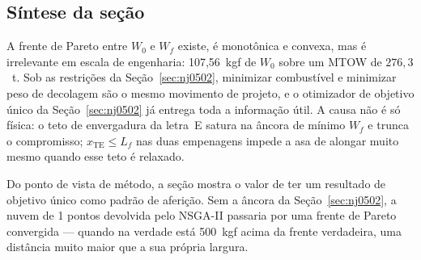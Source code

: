 \subsection{Síntese da seção}
\label{sec:p4sintese}

A frente de Pareto entre $W_0$ e $W_f$ existe, é monotônica e convexa,
mas é irrelevante em escala de engenharia: 107{,}56~kgf de $W_0$
sobre um MTOW de $276{,}3$~t. Sob as restrições da
Seção~\ref{sec:nj0502}, minimizar combustível e minimizar peso de
decolagem são o mesmo movimento de projeto, e o otimizador de objetivo
único da Seção~\ref{sec:nj0502} já entrega toda a informação útil. A
causa não é só física: o teto de envergadura da letra~E satura na
âncora de mínimo $W_f$ e trunca o compromisso; $x_{\mathrm{TE}}\le L_f$
nas duas empenagens impede a asa de alongar muito mesmo quando esse teto
é relaxado.

Do ponto de vista de método, a seção mostra o valor de ter um resultado
de objetivo único como padrão de aferição. Sem a âncora da
Seção~\ref{sec:nj0502}, a nuvem de 1 pontos devolvida pelo
NSGA-II passaria por uma frente de Pareto convergida --- quando na
verdade está 500~kgf acima da frente verdadeira, uma
distância muito maior que a sua própria largura.
